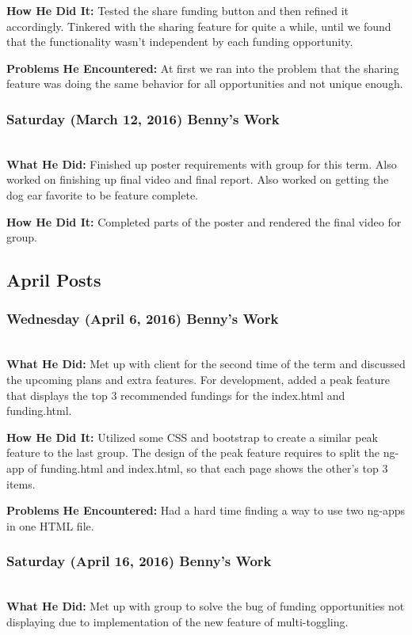 \documentclass[onecolumn]{IEEEtran}
\begin{document}
	\textbf{How He Did It: }
	Tested the share funding button and then refined it accordingly. Tinkered with the sharing feature for quite a while, until we found that the functionality wasn't independent by each funding opportunity. 
    
	\textbf{Problems He Encountered: }
	At first we ran into the problem that the sharing feature was doing the same behavior for all opportunities and not unique enough. 

\subsubsection{Saturday (March 12, 2016) Benny's Work  } \hspace*{\fill} \\
    \textbf{What He Did: } 
    Finished up poster requirements with group for this term. Also worked on finishing up final video and final report. Also worked on getting the dog ear favorite to be feature complete. 
    
	\textbf{How He Did It: }
	Completed parts of the poster and rendered the final video for group. 

\subsection{April Posts}
\subsubsection{Wednesday (April 6, 2016) Benny's Work  } \hspace*{\fill} \\
    \textbf{What He Did: } 
    Met up with client for the second time of the term and discussed the upcoming plans and extra features. For development, added a peak feature that displays the top 3 recommended fundings for the index.html and funding.html.  
    
	\textbf{How He Did It: }
	Utilized some CSS and bootstrap to create a similar peak feature to the last group. The design of the peak feature requires to split the ng-app of funding.html and index.html, so that each page shows the other's top 3 items. 
    
	\textbf{Problems He Encountered: }
	Had a hard time finding a way to use two ng-apps in one HTML file. 

\subsubsection{Saturday (April 16, 2016) Benny's Work  } \hspace*{\fill} \\
    \textbf{What He Did: } 
    Met up with group to solve the bug of funding opportunities not displaying due to implementation of the new feature of multi-toggling. 
    
\end{document}
